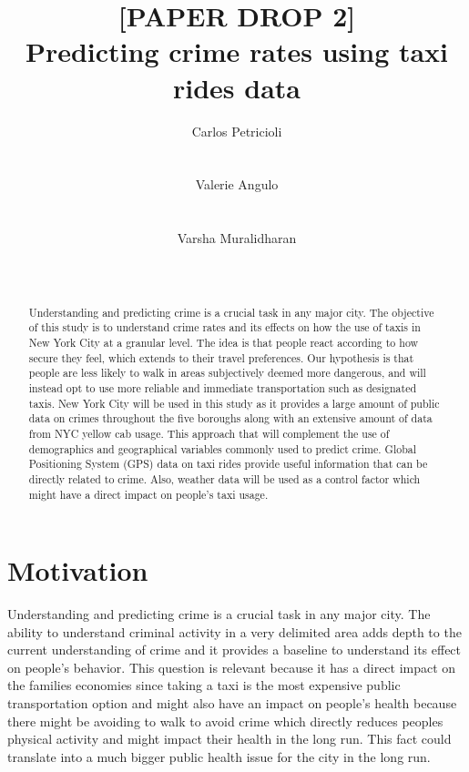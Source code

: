 \documentclass{sigkddExp}
\title{[PAPER DROP 2]\\
Predicting crime rates using taxi rides data}
\author{
\alignauthor Carlos Petricioli \\
       \affaddr{New York University}\\
       \affaddr{New York, USA}\\
       \email{petricioli@nyu.edu}
\alignauthor Valerie Angulo\\
       \affaddr{New York University}\\
       \affaddr{New York, USA}\\
       \email{vaa238@nyu.edu}
\alignauthor Varsha Muralidharan \\
       \affaddr{New York University}\\
       \affaddr{New York, USA}\\
       \email{vm1370@nyu.edu}
}
\begin{document}
\maketitle

\begin{abstract}

Understanding and predicting crime is a crucial task in any major city. The objective of this study is to understand crime rates and its effects on how the use of taxis in New York City at a granular level. The idea  is that people react according to how secure they feel, which extends to their travel preferences. 
Our hypothesis is that people are less likely to walk in areas subjectively deemed more dangerous, and will instead opt to use more reliable and immediate transportation such as designated taxis. 
New York City will be used in this study as it provides a large amount of public data on crimes throughout the five boroughs along with an extensive amount of data from NYC yellow cab usage. 
This approach that will complement the use of demographics and geographical variables commonly used to predict crime. Global Positioning System (GPS) data on taxi rides provide useful information that can be directly related to crime. Also, weather data will be used as a control factor which might have a direct impact on people's taxi usage. 

\end{abstract}




\section{Motivation}

Understanding and predicting crime is a crucial task in any major city. 
The ability to understand criminal activity in a very delimited area adds depth to the current understanding of crime and  it provides a baseline to understand its effect on people's behavior. 
This question is relevant because it has a direct impact on the families economies since taking a taxi is the most expensive public transportation option and might also have an impact on people's health because there might be avoiding to walk to avoid crime which directly reduces peoples physical activity and might impact their health in the long run. 
This fact could translate into a much bigger public health issue for the city in the long run. %
\end{document}
